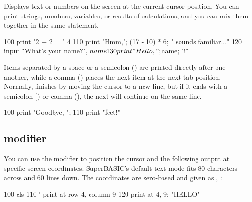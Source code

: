 \begin{entry}
Displays text or numbers on the screen at the current cursor position. You can print strings, numbers, variables, or results of calculations, and you can mix them together in the same statement.

\begin{lstexample}
100 print "2 + 2 = " 4
110 print "Hmm,"; (17 - 10) * 6; " sounds familiar..."
120 input "What's your name?", $name
130 print "Hello, "; $name; "!"
\end{lstexample}

Items separated by a space or a semicolon (\code{;}) are printed directly after one another, while a comma (\code{,}) places the next item at the next tab position.\\

Normally,  finishes by moving the cursor to a new line, but if it ends with a semicolon \mbox{(\code{;})} or comma (\code{,}), the next  will continue on the same line.

\begin{lstexample}
100 print "Goodbye, "; 
110 print "feet!"
\end{lstexample}

\subsection*{ modifier}

You can use the  modifier to position the cursor and the following  output at specific screen coordinates.  SuperBASIC’s default text mode fits 80 characters across and 60 lines down. The  coordinates are zero-based and given as , :

\begin{lstexample}
100 cls
110 ' print at row 4, column 9
120 print at 4, 9; "HELLO"
\end{lstexample}

{ %
    \newcommand{\cellw}{0.38cm}
    \newcommand{\cellh}{0.38cm}
    
    \newcommand{\cutX}{25}   %
    \newcommand{\cutY}{15}   %
    
    \newcommand{\amp}{0.09}   %
    \newcommand{\lam}{1}    %
    \newcommand{\step}{0.25}  %
    \newcommand{\samps}{400}  %

}
\end{entry}
